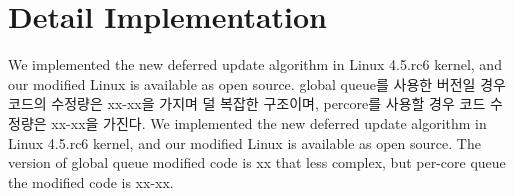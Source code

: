 \section{Detail Implementation}\label{sec:implementation}

\ifkor
We implemented the new deferred update algorithm in Linux 4.5.rc6 kernel, and
our modified Linux is available as open source. 
global queue를 사용한 버전일 경우 코드의 수정량은 xx-xx을 가지며 덜 복잡한 구조이며, 
percore를 사용할 경우 코드 수정량은 xx-xx을 가진다. 
\else
We implemented the new deferred update algorithm in Linux 4.5.rc6 kernel, and
our modified Linux is available as open source. 
The version of global queue modified code is xx that less complex, but per-core
queue the modified code is xx-xx.
\fi

